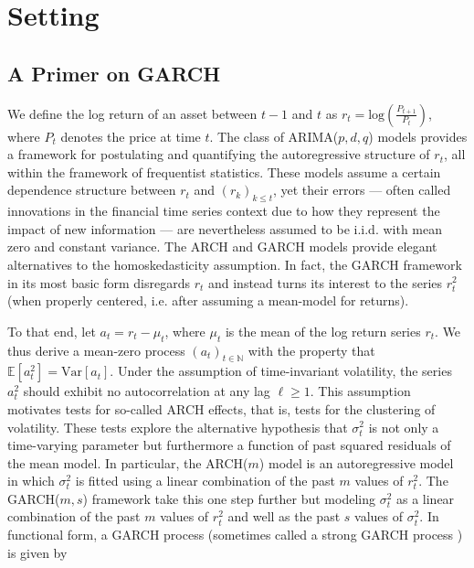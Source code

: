 \documentclass[11pt]{article}
\def\mrm#1{\mathrm{#1}} %
\def\E{\mathbb{E}} %
\theoremstyle{definition}
\begin{document}
\section{Setting}
\label{section2}

\subsection{A Primer on GARCH}
We define the log return of an asset between $t-1$ and $t$ as $r_{t} = \text{log}(\frac{P_{t+1}}{P_{t}})$, where $P_{t}$ denotes the price at time $t$.  The class of ARIMA($p,d,q$) models  \citep{box2013box} provides a framework for postulating and quantifying the autoregressive structure of $r_{t}$, all within the framework of frequentist statistics.  These models assume a certain dependence structure between $r_{t}$ and $(r_{k})_{k\leq t}$, yet their errors --- often called innovations in the financial time series context due to how they represent the impact of new information --- are nevertheless assumed to be i.i.d. with mean zero and constant variance.  The ARCH \citep{engle1982autoregressive} and GARCH \citep{bollerslev1986generalized} models provide elegant alternatives to the homoskedasticity assumption.  In fact, the GARCH framework in its most basic form disregards $r_{t}$ and instead turns its interest to the series $r_{t}^{2}$ (when properly centered, i.e. after assuming a mean-model for returns).  

To that end, let $a_{t} = r_{t} - \mu_{t}$, where $\mu_{t}$ is the mean of the log return series $r_{t}$.  We thus derive a mean-zero process $(a_{t})_{t\in\mathbb{N}}$ with the property that $\E[a^{2}_{t}] = \mrm{Var}[a_{t}]$.  Under the assumption of time-invariant volatility, the series $a_{t}^{2}$ should exhibit no autocorrelation at any lag $\ell\geq1$.  This assumption motivates tests for so-called ARCH effects, that is, tests for the clustering of volatility.  These tests explore the alternative hypothesis that $\sigma_{t}^{2}$ is not only a time-varying parameter but furthermore a function of past squared residuals of the mean model.  In particular, the ARCH($m$) model is an autoregressive model in which $\sigma_{t}^{2}$ is fitted using a linear combination of the past $m$ values of $r_{t}^{2}$.  The GARCH($m,s$) framework take this one step further but modeling $\sigma_{t}^{2}$ as a linear combination of the past $m$ values of $r_{t}^{2}$ and well as the past $s$ values of $\sigma_{t}^{2}$.  In functional form, a GARCH process (sometimes called a strong GARCH process \citep[p. 19]{francq2019garch}) is given by
\end{document}
